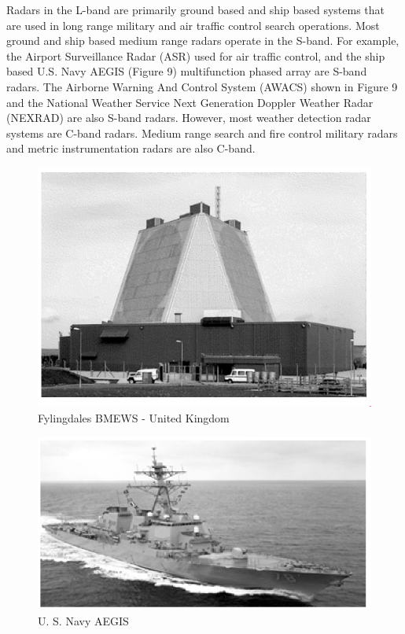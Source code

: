 \documentclass[14pt]{article} %
\begin{document}
Radars in the L-band are primarily ground based and ship based systems that are used in long range military and air traffic control search operations. Most ground and ship based medium range radars operate in the S-band. For example, the Airport Surveillance Radar (ASR) used for air traffic control, and the ship based U.S. Navy AEGIS (Figure 9) multifunction phased array are S-band radars. The Airborne Warning And Control System (AWACS) shown in Figure 9 and the National Weather Service Next Generation Doppler Weather Radar (NEXRAD) are also S-band radars. However, most weather detection radar systems are C-band radars. Medium range search and fire control military radars and metric instrumentation radars are also C-band.
 \begin{figure}[H]
   \includegraphics[width=\linewidth]{fylingdales.png}
  \caption{Fylingdales BMEWS - United Kingdom}
  \label{fig:figure 7}
\end{figure}
\begin{figure}[H]
  \includegraphics[width=\linewidth]{Navy.png}
  \caption{U. S. Navy AEGIS}
  \label{fig:figure 8}
\end{figure}
\end{document}
